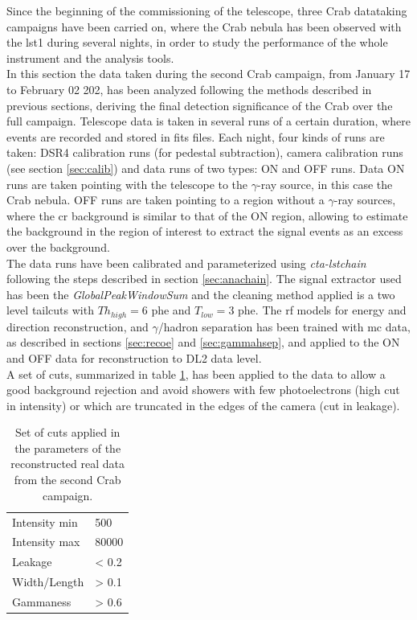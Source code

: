 \documentclass[main.tex]{subfiles}
\begin{document}
Since the beginning of the commissioning of the telescope, three Crab datataking campaigns have been carried on, where the Crab nebula has been observed with the \gls{lst}1 during several nights, in order to study the performance of the whole instrument and the analysis tools.\\
In this section the data taken during the second Crab campaign, from January 17 to February 02 202, has been analyzed following the methods described in previous sections, deriving the final detection significance of the Crab over the full campaign. Telescope data is taken in several runs of a certain duration, where events are recorded and stored in fits files. Each night, four kinds of runs are taken: DSR4 calibration runs (for pedestal subtraction), camera calibration runs (see section \ref{sec:calib}) and data runs of two types: ON and OFF runs. Data ON runs are taken pointing with the telescope to the $\gamma$-ray source, in this case the Crab nebula. OFF runs are taken pointing to a region without a $\gamma$-ray sources, where the \gls{cr} background is similar to that of the ON region, allowing to estimate the background in the region of interest to extract the signal events as an excess over the background.\\
The data runs have been calibrated and parameterized using \textit{cta-lstchain} following the steps described in section \ref{sec:anachain}. The signal extractor used has been the \textit{GlobalPeakWindowSum}  and the cleaning method applied is a two level tailcuts with $Th_{high}=6$ phe and $T_{low}=3$ phe. The \gls{rf} models for energy and direction reconstruction, and $\gamma$/hadron separation has been trained with \gls{mc} data, as described in sections \ref{sec:recoe} and \ref{sec:gammahsep}, and applied to the ON and OFF data for reconstruction to DL2 data level.\\
A set of cuts, summarized in table \ref{tab:cuts}, has been applied to the data to allow a good background rejection and avoid showers with few photoelectrons (high cut in intensity) or which are truncated in the edges of the camera (cut in leakage).

\begin{table}
  \centering
    \begin{tabular}{|l|l|}
      \hline
      Intensity min & 500  \\
      Intensity max & 80000 \\
      Leakage       & < 0.2 \\
      Width/Length  & > 0.1 \\
      Gammaness     & > 0.6 \\
      \hline
      \end{tabular}
  \caption{Set of cuts applied in the parameters of the reconstructed real data from the second Crab campaign.}\label{tab:cuts}
\end{table}
\end{document}
